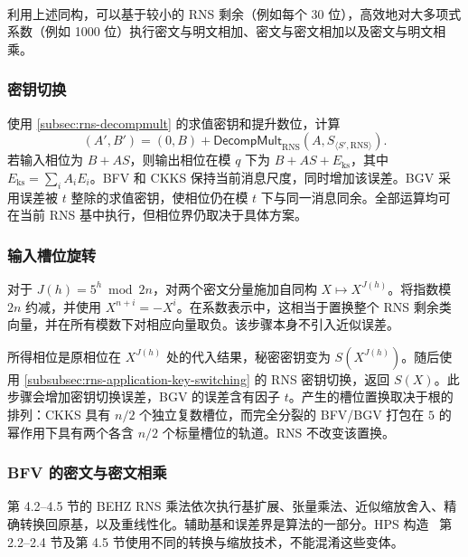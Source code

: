 $ $

利用上述同构，可以基于较小的 RNS 剩余（例如每个 30 位），高效地对大多项式系数（例如 1000 位）执行密文与明文相加、密文与密文相加以及密文与明文相乘。


\subsubsection{密钥切换}
\label{subsubsec:rns-application-key-switching}

使用 \autoref{subsec:rns-decompmult} 的求值密钥和提升数位，计算
\[
(A',B')=(0,B)+\textsf{DecompMult}_{\mathrm{RNS}}(A,S_{\langle S',\mathrm{RNS}\rangle}).
\]
若输入相位为 $B+AS$，则输出相位在模 $q$ 下为 $B+AS+E_{\mathrm{ks}}$，其中 $E_{\mathrm{ks}}=\sum_iA_iE_i$。BFV 和 CKKS 保持当前消息尺度，同时增加该误差。BGV 采用误差被 $t$ 整除的求值密钥，使相位仍在模 $t$ 下与同一消息同余。全部运算均可在当前 RNS 基中执行，但相位界仍取决于具体方案。


\subsubsection{输入槽位旋转}
\label{subsubsec:rns-rotation}

对于 $J(h)=5^h\bmod2n$，对两个密文分量施加自同构 $X\mapsto X^{J(h)}$。将指数模 $2n$ 约减，并使用 $X^{n+i}=-X^i$。在系数表示中，这相当于置换整个 RNS 剩余类向量，并在所有模数下对相应向量取负。该步骤本身不引入近似误差。

所得相位是原相位在 $X^{J(h)}$ 处的代入结果，秘密密钥变为 $S(X^{J(h)})$。随后使用 \autoref{subsubsec:rns-application-key-switching} 的 RNS 密钥切换，返回 $S(X)$。此步骤会增加密钥切换误差，BGV 的误差含有因子 $t$。产生的槽位置换取决于根的排列：CKKS 具有 $n/2$ 个独立复数槽位，而完全分裂的 BFV/BGV 打包在 $5$ 的幂作用下具有两个各含 $n/2$ 个标量槽位的轨道。RNS 不改变该置换。

\subsubsection{BFV 的密文与密文相乘}
\label{subsubsec:rns-cipher-mult-bfv}

\cite{rns-bfv} 第 4.2--4.5 节的 BEHZ RNS 乘法依次执行基扩展、张量乘法、近似缩放舍入、精确转换回原基，以及重线性化。辅助基和误差界是算法的一部分。HPS 构造~\cite{rns-bfv-hps} 第 2.2--2.4 节及第 4.5 节使用不同的转换与缩放技术，不能混淆这些变体。

